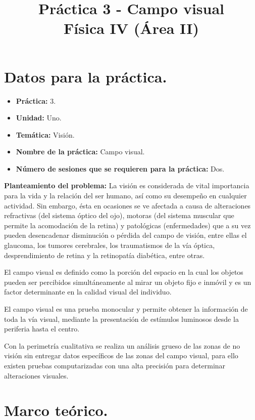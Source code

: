 \documentclass[14pt]{extarticle}
\title{\vspace*{-2cm} Práctica 3 - Campo visual \\  Física IV (Área II) \vspace{-5ex}}
\date{}
\begin{document}
\maketitle

\section{Datos para la práctica.}

\begin{itemize}
\itemsep0em 
\item  \textbf{Práctica:} 3.
\item \textbf{Unidad:} Uno.
\item \textbf{Temática:} Visión.
\item \textbf{Nombre de la práctica:} Campo visual.
\item \textbf{Número de sesiones que se requieren para la práctica:} Dos.
\end{itemize}
\textbf{Planteamiento del problema:} La visión es considerada de vital importancia para la vida y la relación del ser humano, así como su desempeño en cualquier actividad. Sin embargo, ésta en ocasiones se ve afectada a causa de alteraciones refractivas (del sistema óptico del ojo), motoras (del sistema muscular que permite la acomodación de la retina) y patológicas (enfermedades) que a su vez pueden desencadenar disminución o pérdida del campo de visión, entre ellas el glaucoma, los tumores cerebrales, los traumatismos de la vía óptica, 
desprendimiento de retina y la retinopatía diabética, entre otras.

El campo visual es definido como la porción del espacio en la cual los objetos pueden ser percibidos simultáneamente al mirar un objeto fijo e inmóvil y es un factor determinante en la calidad visual del individuo.

El campo visual es una prueba monocular y permite obtener la información de toda la vía visual, mediante la presentación de estímulos luminosos desde la periferia hasta el centro.

Con la perimetría cualitativa se realiza un análisis grueso de las zonas de no visión sin entregar datos específicos de las zonas del campo visual, para ello existen pruebas computarizadas con una alta precisión para determinar alteraciones visuales.

\section{Marco teórico.}
\end{document}
